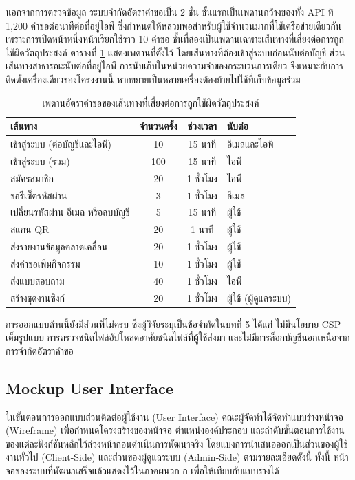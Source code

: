 นอกจากการตรวจข้อมูล ระบบจำกัดอัตราคำขอเป็น 2 ชั้น ชั้นแรกเป็นเพดานกว้างของทั้ง API ที่ 1,200 คำขอต่อนาทีต่อที่อยู่ไอพี ซึ่งกำหนดให้หลวมพอสำหรับผู้ใช้จำนวนมากที่ใช้เครือข่ายเดียวกัน เพราะการเปิดหน้าหนึ่งหน้าเรียกใช้ราว 10 คำขอ ชั้นที่สองเป็นเพดานเฉพาะเส้นทางที่เสี่ยงต่อการถูกใช้ผิดวัตถุประสงค์ ตารางที่ \ref{tab:rate_limits} แสดงเพดานที่ตั้งไว้ โดยเส้นทางที่ต้องเข้าสู่ระบบก่อนนับต่อบัญชี ส่วนเส้นทางสาธารณะนับต่อที่อยู่ไอพี การนับเก็บในหน่วยความจำของกระบวนการเดียว จึงเหมาะกับการติดตั้งเครื่องเดียวของโครงงานนี้ หากขยายเป็นหลายเครื่องต้องย้ายไปใช้ที่เก็บข้อมูลร่วม

\begin{table}[H]
\centering
\caption{เพดานอัตราคำขอของเส้นทางที่เสี่ยงต่อการถูกใช้ผิดวัตถุประสงค์}
\label{tab:rate_limits}
\begin{tabular}{|p{5.6cm}|c|c|p{2.6cm}|}
\hline
\textbf{เส้นทาง} & \textbf{จำนวนครั้ง} & \textbf{ช่วงเวลา} & \textbf{นับต่อ} \\
\hline
เข้าสู่ระบบ (ต่อบัญชีและไอพี) & 10 & 15 นาที & อีเมลและไอพี \\ \hline
เข้าสู่ระบบ (รวม) & 100 & 15 นาที & ไอพี \\ \hline
สมัครสมาชิก & 20 & 1 ชั่วโมง & ไอพี \\ \hline
ขอรีเซ็ตรหัสผ่าน & 3 & 1 ชั่วโมง & อีเมล \\ \hline
เปลี่ยนรหัสผ่าน อีเมล หรือลบบัญชี & 5 & 15 นาที & ผู้ใช้ \\ \hline
สแกน QR & 20 & 1 นาที & ผู้ใช้ \\ \hline
ส่งรายงานข้อมูลคลาดเคลื่อน & 20 & 1 ชั่วโมง & ผู้ใช้ \\ \hline
ส่งคำขอเพิ่มกิจกรรม & 10 & 1 ชั่วโมง & ผู้ใช้ \\ \hline
ส่งแบบสอบถาม & 40 & 1 ชั่วโมง & ไอพี \\ \hline
สร้างชุดงานซิงก์ & 20 & 1 ชั่วโมง & ผู้ใช้ (ผู้ดูแลระบบ) \\
\hline
\end{tabular}
\end{table}

การออกแบบด้านนี้ยังมีส่วนที่ไม่ครบ ซึ่งผู้วิจัยระบุเป็นข้อจำกัดในบทที่ 5 ได้แก่ ไม่มีนโยบาย CSP เต็มรูปแบบ การตรวจชนิดไฟล์อัปโหลดอาศัยชนิดไฟล์ที่ผู้ใช้ส่งมา และไม่มีการล็อกบัญชีนอกเหนือจากการจำกัดอัตราคำขอ

\subsection{Mockup User Interface}

ในขั้นตอนการออกแบบส่วนติดต่อผู้ใช้งาน (User Interface) คณะผู้จัดทำได้จัดทำแบบร่างหน้าจอ (Wireframe) เพื่อกำหนดโครงสร้างของหน้าจอ ตำแหน่งองค์ประกอบ และลำดับขั้นตอนการใช้งานของแต่ละฟังก์ชันหลักไว้ล่วงหน้าก่อนดำเนินการพัฒนาจริง โดยแบ่งการนำเสนอออกเป็นส่วนของผู้ใช้งานทั่วไป (Client-Side) และส่วนของผู้ดูแลระบบ (Admin-Side) ตามรายละเอียดดังนี้ ทั้งนี้ หน้าจอของระบบที่พัฒนาเสร็จแล้วแสดงไว้ในภาคผนวก ก เพื่อให้เทียบกับแบบร่างได้

